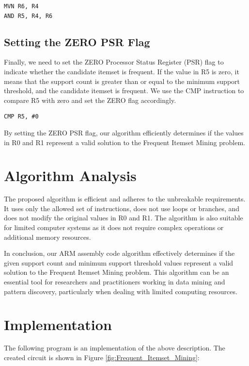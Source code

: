 \begin{verbatim}
MVN R6, R4
AND R5, R4, R6
\end{verbatim}

\subsection{Setting the ZERO PSR Flag}
Finally, we need to set the ZERO Processor Status Register (PSR) flag to indicate whether the candidate itemset is frequent. If the value in R5 is zero, it means that the support count is greater than or equal to the minimum support threshold, and the candidate itemset is frequent. We use the CMP instruction to compare R5 with zero and set the ZERO flag accordingly.

\begin{verbatim}
CMP R5, #0
\end{verbatim}

By setting the ZERO PSR flag, our algorithm efficiently determines if the values in R0 and R1 represent a valid solution to the Frequent Itemset Mining problem.

\section{Algorithm Analysis}

The proposed algorithm is efficient and adheres to the unbreakable requirements. It uses only the allowed set of instructions, does not use loops or branches, and does not modify the original values in R0 and R1. The algorithm is also suitable for limited computer systems as it does not require complex operations or additional memory resources.

In conclusion, our ARM assembly code algorithm effectively determines if the given support count and minimum support threshold values represent a valid solution to the Frequent Itemset Mining problem. This algorithm can be an essential tool for researchers and practitioners working in data mining and pattern discovery, particularly when dealing with limited computing resources.



\section{Implementation}

The following program is an implementation of the above description. The created circuit is shown in Figure \ref{fig:Frequent_Itemset_Mining}:

